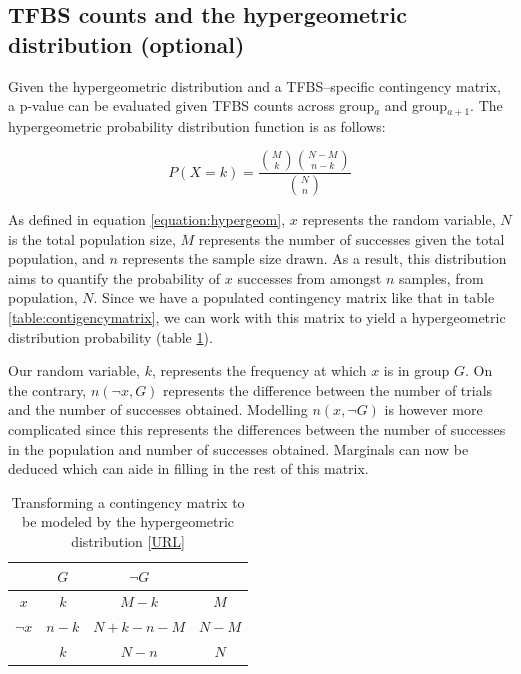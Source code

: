 \documentclass{article}
\begin{document}
\subsection{TFBS counts and the hypergeometric distribution (optional)}
\label{section:hypergeometric}
Given the hypergeometric distribution and a TFBS--specific contingency matrix, 
a p-value can be evaluated given TFBS counts across group$_{a}$ and group$_{a+1}$. 
The hypergeometric probability distribution function is as follows:

\begin{equation}
	P(X=k) = \frac{ {M\choose{k}} {{N-M}\choose{n-k}} }{{N\choose{n}}}
	\label{equation:hypergeom}
\end{equation}

As defined in equation \ref{equation:hypergeom}, $x$ represents the random
variable, $N$ is the total population size, $M$ represents the number of
successes given the total population, and $n$ represents the sample size drawn.
As a result, this distribution aims to quantify the probability of $x$
successes from amongst $n$ samples, from population, $N$.
Since we have a populated contingency matrix like that in table
\ref{table:contigencymatrix}, we can work with this matrix to 
yield a hypergeometric distribution probability (table \ref{table:hypergeom}).

Our random variable, $k$, represents the frequency at which $x$ is in group $G$.
On the contrary, $n(\neg{x}, G)$ represents the difference between the number of
trials and the number of successes obtained. Modelling $n(x, \neg{G})$ is however
more complicated since this represents the differences between the number of
successes in the population and number of successes obtained. Marginals can now
be deduced which can aide in filling in the rest of this matrix.

\begin{table}[htbc]
	\centering
	\begin{tabular}{c | c | c | c}
	  & $G$    & $\neg{G}$ & \\ \hline
	$x$ & $k$ & $M - k$ & $M$\\
	$\neg{x}$ & $n - k$ & $N + k - n - M$ & $N - M$\\ \hline
	& $k$ & $N - n$ & $N$\\
	\end{tabular}
	\caption{Transforming a contingency matrix to be modeled by the hypergeometric
	distribution [\href{http://en.wikipedia.org/wiki/Hypergeometric_distribution}{URL}]}
	\label{table:hypergeom}
\end{table}
\end{document}
